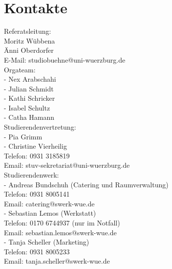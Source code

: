 \section{Kontakte}
Referatsleitung:\\
Moritz Wübbena \\
Änni Oberdorfer\\
E-Mail: studiobuehne@uni-wuerzburg.de  \\    

Orgateam:\\
- Nex Arabschahi \\
- Julian Schmidt \\
- Kathi Schricker \\
- Isabel Schultz\\
- Catha Hamann \\

Studierendenvertretung:\\
- Pia Grimm\\
- Christine Vierheilig\\
Telefon: 0931 3185819\\
Email: stuv-sekretariat@uni-wuerzburg.de\\

Studierendenwerk:	\\
- Andreas Bundschuh (Catering und Raumverwaltung)\\
Telefon: 0931 8005141\\
Email: catering@swerk-wue.de\\

- Sebastian Lemos (Werkstatt)\\
Telefon: 0170 6744937 (nur im Notfall)\\
Email: sebastian.lemos@swerk-wue.de\\

- Tanja Scheller (Marketing)\\
Telefon: 0931 8005233 \\
Email: tanja.scheller@swerk-wue.de 

